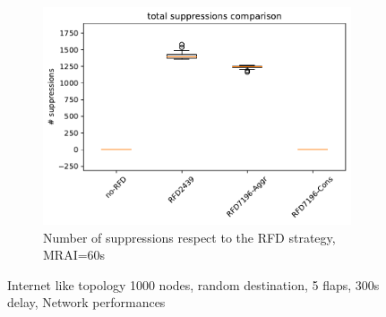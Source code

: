 \begin{figure}[H]
\begin{subfigure}[b]{0.325\textwidth}
         \label{fig:1000_RFD_MRAI30_messages_mice}
     \end{subfigure}
     \hfill
     \begin{subfigure}[b]{0.325\textwidth}
         \centering
         \includegraphics[width=\textwidth]{images/RFD/miceVSelephants/MultiMRAI/60/mice/cisco_1000MRAI60_rfd_comparison_suppressions_boxplot.pdf}
         \caption{Number of suppressions respect to the RFD strategy, MRAI=60s}
         \label{fig:1000_RFD_MRAI30_suppressions_mice}
     \end{subfigure}
        \caption{Internet like topology 1000 nodes, random destination, 5 flaps, 300s delay, Network performances}
        \label{fig:1000_RFD_MRAI30_mice}
\end{figure}

